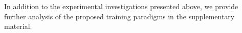 In addition to the experimental investigations presented above, we provide further analysis of the proposed training paradigms in the supplementary material. 


       
 


